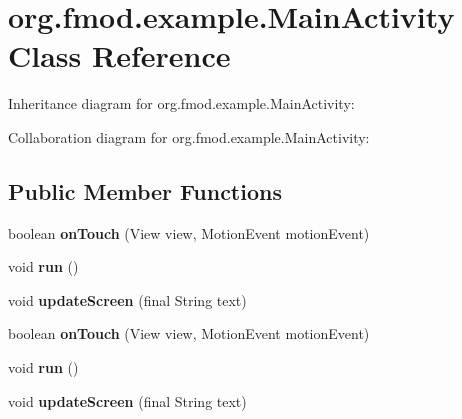 \hypertarget{classorg_1_1fmod_1_1example_1_1_main_activity}{\section{org.\+fmod.\+example.\+Main\+Activity Class Reference}
\label{classorg_1_1fmod_1_1example_1_1_main_activity}
}


Inheritance diagram for org.\+fmod.\+example.\+Main\+Activity\+:


Collaboration diagram for org.\+fmod.\+example.\+Main\+Activity\+:
\subsection*{Public Member Functions}
\begin{DoxyCompactItemize}
\item 
\hypertarget{classorg_1_1fmod_1_1example_1_1_main_activity_acbaf58b4ebd02bcc07d39e7e17d02c1c}{boolean {\bfseries on\+Touch} (View view, Motion\+Event motion\+Event)}\label{classorg_1_1fmod_1_1example_1_1_main_activity_acbaf58b4ebd02bcc07d39e7e17d02c1c}

\item 
\hypertarget{classorg_1_1fmod_1_1example_1_1_main_activity_a0e3da8ea89a2ee1e5f5175b5886eeceb}{void {\bfseries run} ()}\label{classorg_1_1fmod_1_1example_1_1_main_activity_a0e3da8ea89a2ee1e5f5175b5886eeceb}

\item 
\hypertarget{classorg_1_1fmod_1_1example_1_1_main_activity_af3a97b564e4e37057e45b325087e61e7}{void {\bfseries update\+Screen} (final String text)}\label{classorg_1_1fmod_1_1example_1_1_main_activity_af3a97b564e4e37057e45b325087e61e7}

\item 
\hypertarget{classorg_1_1fmod_1_1example_1_1_main_activity_acbaf58b4ebd02bcc07d39e7e17d02c1c}{boolean {\bfseries on\+Touch} (View view, Motion\+Event motion\+Event)}\label{classorg_1_1fmod_1_1example_1_1_main_activity_acbaf58b4ebd02bcc07d39e7e17d02c1c}

\item 
\hypertarget{classorg_1_1fmod_1_1example_1_1_main_activity_a0e3da8ea89a2ee1e5f5175b5886eeceb}{void {\bfseries run} ()}\label{classorg_1_1fmod_1_1example_1_1_main_activity_a0e3da8ea89a2ee1e5f5175b5886eeceb}

\item 
\hypertarget{classorg_1_1fmod_1_1example_1_1_main_activity_af3a97b564e4e37057e45b325087e61e7}{void {\bfseries update\+Screen} (final String text)}\label{classorg_1_1fmod_1_1example_1_1_main_activity_af3a97b564e4e37057e45b325087e61e7}

\end{DoxyCompactItemize}
